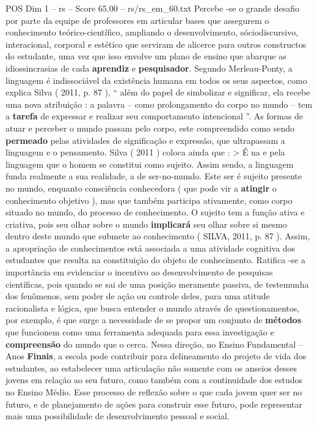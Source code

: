 \begin{textsample}{POS Dim 1 – rs – Score 65.00 – rs/rs\_em\_60.txt}
Percebe -se o grande desafio por parte da equipe de professores em articular bases que assegurem o conhecimento teórico-científico, ampliando o desenvolvimento, sóciodiscursivo, interacional, corporal e estético que serviram de alicerce para outros constructos do estudante, uma vez que isso envolve um plano de ensino que abarque as idiossincrasias de cada \textbf{aprendiz} e \textbf{pesquisador}.
Segundo Merleau-Ponty, a linguagem é indissociável da existência humana em todos os seus aspectos, como explica Silva ( 2011, p. 87 ), “ além do papel de simbolizar e significar, ela recebe uma nova atribuição : a palavra – como prolongamento do corpo no mundo – tem a \textbf{tarefa} de expressar e realizar seu comportamento intencional ”.
As formas de atuar e perceber o mundo passam pelo corpo, este compreendido como sendo \textbf{permeado} pelas atividades de significação e expressão, que ultrapassam a linguagem e o pensamento.
Silva ( 2011 ) coloca ainda que : > É na e pela linguagem que o homem se constitui como sujeito.
Assim sendo, a linguagem funda realmente a sua realidade, a de ser-no-mundo.
Este ser é sujeito presente no mundo, enquanto consciência conhecedora ( que pode vir a \textbf{atingir} o conhecimento objetivo ), mas que também participa ativamente, como corpo situado no mundo, do processo de conhecimento.
O sujeito tem a função ativa e criativa, pois seu olhar sobre o mundo \textbf{implicará} seu olhar sobre si mesmo dentro deste mundo que submete ao conhecimento ( SILVA, 2011, p. 87 ).
Assim, a apropriação de conhecimentos está associada a uma atividade cognitiva dos estudantes que resulta na constituição do objeto de conhecimento.
Ratifica -se a importância em evidenciar o incentivo ao desenvolvimento de pesquisas científicas, pois quando se sai de uma posição meramente passiva, de testemunha dos fenômenos, sem poder de ação ou controle deles, para uma atitude racionalista e lógica, que busca entender o mundo através de questionamentos, por exemplo, é que surge a necessidade de se propor um conjunto de \textbf{métodos} que funcionem como uma ferramenta adequada para essa investigação e \textbf{compreensão} do mundo que o cerca.
Nessa direção, no Ensino Fundamental – Anos \textbf{Finais}, a escola pode contribuir para delineamento do projeto de vida dos estudantes, ao estabelecer uma articulação não somente com os anseios desses jovens em relação ao seu futuro, como também com a continuidade dos estudos no Ensino Médio.
Esse processo de reflexão sobre o que cada jovem quer ser no futuro, e de planejamento de ações para construir esse futuro, pode representar mais uma possibilidade de desenvolvimento pessoal e social.

\end{textsample}
